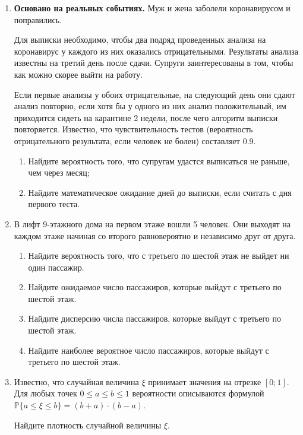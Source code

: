 \documentclass[12pt]{article}
\begin{document}
\begin{enumerate}
\item \textbf{Основано на реальных событиях.} Муж и жена заболели коронавирусом и поправились. 

Для выписки необходимо, чтобы два подряд проведенных анализа на коронавирус у каждого из них оказались отрицательными. 
Результаты анализа известны на третий день после сдачи. 
Супруги заинтересованы в том, чтобы как можно скорее выйти на работу. 

Если первые анализы у обоих отрицательные, на следующий день они сдают анализ повторно, 
если хотя бы у одного из них анализ положительный, им приходится сидеть на карантине 2 недели, 
после чего алгоритм выписки повторяется. 
Известно, что чувствительность тестов (вероятность отрицательного результата, если человек не болен) 
составляет 0.9. 
	
\begin{enumerate}
    
    \item Найдите вероятность того, что супругам удастся выписаться не раньше, чем через месяц;
    
    \item Найдите математическое ожидание дней до выписки, если считать с дня первого теста.
    
\end{enumerate}

\item  В лифт 9-этажного дома на первом этаже вошли 5 человек. 
Они выходят на каждом этаже начиная со второго равновероятно и независимо друг от друга.

\begin{enumerate}
    
    \item Найдите вероятность того, что с третьего по шестой этаж не выйдет ни один пассажир.
    
    \item Найдите ожидаемое число пассажиров, которые выйдут с третьего по шестой этаж.
    
    \item Найдите дисперсию числа пассажиров, которые выйдут с третьего по шестой этаж.
    
    \item Найдите наиболее вероятное число пассажиров, которые выйдут с третьего по шестой этаж.
    
\end{enumerate}

\item Известно, что случайная величина $\xi$ принимает значения на отрезке $[0; 1]$. 
Для любых точек $0 \leq a \leq b \leq 1$ 
вероятности описываются формулой $\mathbb{P}{\{a \leq \xi \leq b\}} = (b+a) \cdot (b - a)$. 

Найдите плотность случайной величины $\xi$.
\end{enumerate}
\end{document}
